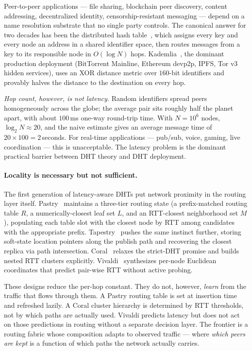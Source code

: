 \documentclass[conference]{IEEEtran}
\begin{document}
Peer-to-peer applications --- file sharing, blockchain peer discovery, content
addressing, decentralized identity, censorship-resistant messaging --- depend
on a name resolution substrate that no single party controls. The canonical
answer for two decades has been the distributed hash
table~\cite{stoica2001chord,maymounkov2002kademlia,rowstron2001pastry,zhao2004tapestry,ratnasamy2001can},
which assigns every key and every node an address in a shared identifier
space, then routes messages from a key to its responsible node in
$O(\log N)$ hops. Kademlia~\cite{maymounkov2002kademlia}, the dominant
production deployment (BitTorrent Mainline, Ethereum devp2p, IPFS, Tor v3
hidden services), uses an XOR distance metric over $160$-bit identifiers and
provably halves the distance to the destination on every hop.

\emph{Hop count, however, is not latency.} Random identifiers spread peers
homogeneously across the globe; the average pair sits roughly half the planet
apart, with about $100$\,ms one-way round-trip time. With $N = 10^6$ nodes,
$\log_2 N \approx 20$, and the naive estimate gives an average message time
of $20 \times 100 = 2$\,seconds. For real-time applications --- pub/sub,
voice, gaming, live coordination --- this is unacceptable. The latency
problem is the dominant practical barrier between DHT theory and DHT
deployment.

\paragraph{Locality is necessary but not sufficient.}
The first generation of latency-aware DHTs put network proximity in the
routing layer itself. Pastry~\cite{rowstron2001pastry} maintains a three-tier
routing state (a prefix-matched routing table $R$, a numerically-closest leaf
set $L$, and an RTT-closest neighborhood set $M$), populating each table
slot with the closest node by RTT among candidates with the appropriate
prefix. Tapestry~\cite{zhao2004tapestry} pushes the same instinct further,
storing soft-state location pointers along the publish path and recovering
the closest replica via path intersection. Coral~\cite{freedman2004coral}
relaxes the strict-DHT promise and builds nested RTT clusters explicitly.
Vivaldi~\cite{dabek2004vivaldi} synthesizes per-node Euclidean coordinates
that predict pair-wise RTT without active probing.

These designs reduce the per-hop constant. They do not, however,
\emph{learn} from the traffic that flows through them. A Pastry routing
table is set at insertion time and refreshed lazily. A Coral cluster
hierarchy is determined by RTT thresholds, not by which paths are
actually used. Vivaldi predicts latency but does not act on those
predictions in routing without a separate decision layer. The frontier
is a routing fabric whose composition adapts to observed traffic ---
where \emph{which peers are kept} is a function of which paths the network
actually carries.
\end{document}
